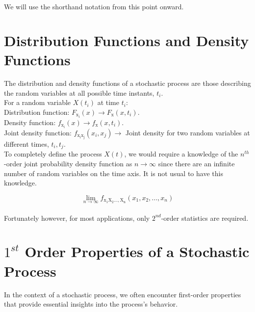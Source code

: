 \documentclass[12pt]{book}
\theoremstyle{definition}
\begin{document}
We will use the shorthand notation from this point onward.

\section{Distribution Functions and Density Functions}

The distribution and density functions of a stochastic process are those describing the random variables at all possible time instants, \(t_i\).\\

For a random variable \(X(t_i)\) at time \(t_i\): \\

Distribution function:
$F_\mathrm{x_i} (x) \rightarrow F_\mathrm{x}(x, t_i)$.\\

Density function:
$f_\mathrm{x_i}(x) \rightarrow f_\mathrm{x}(x, t_i)$.\\

Joint density function:
$f_\mathrm{x_i x_j}(x_i, x_j) \rightarrow$ Joint density for two random variables at different times, \(t_i, t_j\).\\

To completely define the process \(X(t)\), we would require a knowledge of the \(n^{th}\)-order joint probability density function as \(n \rightarrow\infty\) since there are an infinite number of random variables on the time axis. It is not usual to have this knowledge. 

\[
\lim_{{n \to \infty}} f_\mathrm{x_1 X_2 \ldots, X_n} (x_1, x_2, \ldots, x_n)
\]\\

Fortunately however, for most applications, only \(2^{nd}\)-order statistics are required.\\


\section{\(1^{st}\) Order Properties of a Stochastic Process}

In the context of a stochastic process, we often encounter first-order properties that provide essential insights into the process's behavior. 
\end{document}
